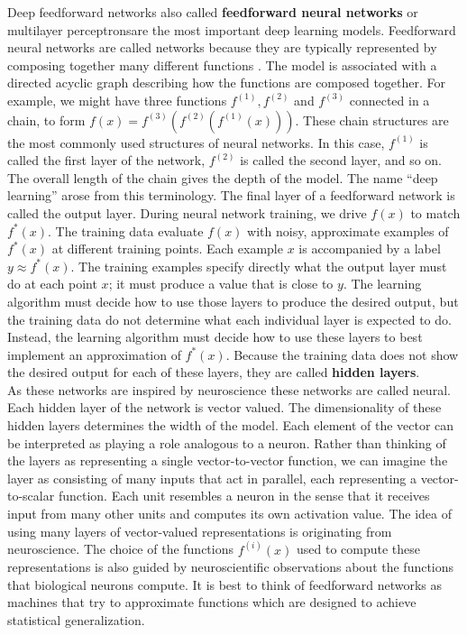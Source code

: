 Deep feedforward networks also called \textbf{feedforward neural networks} or multilayer perceptronsare the most important deep learning models. Feedforward neural networks are called networks because they are typically represented by  composing together many different functions \cite{Goodfellow-et-al-2016}. The model is associated with a directed acyclic graph describing how the functions are composed together. For example, we might have three functions $f^{(1)},f^{(2)}$ and $f^{(3)}$ connected in a chain, to form $f(x) = f^{(3)}(f^{(2)}(f^{(1)}(x)))$. These chain structures are the most commonly used structures of neural networks. In this case, $f^{(1)}$ is called the first layer of the network, $f^{(2)}$ is called the second layer, and so on. The overall length of the chain gives the depth of the model. The name ``deep learning'' arose from this terminology. The final layer of a feedforward  network  is called the output layer. During neural network training, we drive $f(x)$ to match $f^{*}(x)$. The training data evaluate $f(x)$ with noisy, approximate examples of $f^{*}(x)$ at different training points. Each example $x$ is accompanied by a label $y \approx f^{*}(x)$. The training examples specify directly what the output layer must do at each point $x$; it must produce a value that is close to $y$. The learning algorithm must decide how to use those layers to produce the desired output, but the training data do not determine what each individual layer is expected to do. Instead, the learning algorithm must decide  how to use these layers to best implement an approximation of $f^{*}(x)$. Because the training data does not show the desired output for each of these layers, they are called \textbf{hidden layers}. \cite{Goodfellow-et-al-2016}\\
As these networks are inspired by neuroscience these networks are called neural. Each hidden layer of the network is vector valued. The dimensionality of these hidden layers determines the width of the model. Each element of the vector can be interpreted as playing a role analogous to a neuron. Rather than thinking of the layers as representing a single vector-to-vector function, we can imagine the layer as consisting of many inputs that act in parallel, each representing a vector-to-scalar function. Each unit resembles a neuron in the sense that it receives input from many other units and computes its own activation value. The idea of using many layers of vector-valued representations is originating from neuroscience.  The choice of the functions $f^{(i)}(x)$ used to compute these representations is also guided by neuroscientific observations about the functions that biological neurons compute. It is best to think of feedforward networks as machines that try to approximate functions which are designed to achieve statistical generalization.  \cite{Goodfellow-et-al-2016}\\
